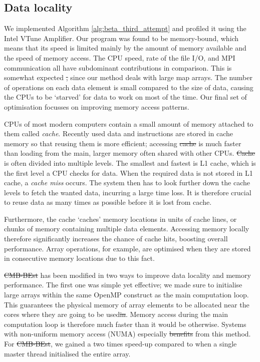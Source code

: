 \documentclass[a4paper,12pt,times,custombib,print,index]{Classes/PhDThesisPSnPDF} %
\providecommand{\DIFadd}[1]{{\protect\color{blue}\uwave{#1}}} %
\providecommand{\DIFdel}[1]{{\protect\color{red}\sout{#1}}}                      %
\providecommand{\DIFaddbegin}{} %
\providecommand{\DIFaddend}{} %
\providecommand{\DIFdelbegin}{} %
\providecommand{\DIFdelend}{} %
\newcommand{\DIFscaledelfig}{0.5}
\newlength{\DIFdelgraphicswidth} %
\newlength{\DIFdelgraphicsheight} %
\newcommand{\DIFaddincludegraphics}[2][]{{\color{blue}\fbox{\DIFOincludegraphics[#1]{#2}}}} %
\newcommand{\DIFdelincludegraphics}[2][]{%
\sbox{\DIFdelgraphicsbox}{\DIFOincludegraphics[#1]{#2}}%
\settoboxwidth{\DIFdelgraphicswidth}{\DIFdelgraphicsbox} %
\settoboxtotalheight{\DIFdelgraphicsheight}{\DIFdelgraphicsbox} %
\scalebox{\DIFscaledelfig}{%
\parbox[b]{\DIFdelgraphicswidth}{\usebox{\DIFdelgraphicsbox}\\[-\baselineskip] \rule{\DIFdelgraphicswidth}{0em}}\llap{\resizebox{\DIFdelgraphicswidth}{\DIFdelgraphicsheight}{%
\setlength{\unitlength}{\DIFdelgraphicswidth}%
\begin{picture}(1,1)%
\thicklines\linethickness{2pt} %
{\color[rgb]{1,0,0}\put(0,0){\framebox(1,1){}}}%
{\color[rgb]{1,0,0}\put(0,0){\line( 1,1){1}}}%
{\color[rgb]{1,0,0}\put(0,1){\line(1,-1){1}}}%
\end{picture}%
}\hspace*{3pt}}} %
} %
\DeclareRobustCommand{\DIFaddbegin}{\DIFOaddbegin \let\includegraphics\DIFaddincludegraphics} %
\DeclareRobustCommand{\DIFaddend}{\DIFOaddend \let\includegraphics\DIFOincludegraphics} %
\DeclareRobustCommand{\DIFdelbegin}{\DIFOdelbegin \let\includegraphics\DIFdelincludegraphics} %
\DeclareRobustCommand{\DIFdelend}{\DIFOaddend \let\includegraphics\DIFOincludegraphics} %
\begin{document}
\subsection{Data locality}

We implemented Algorithm \ref{alg:beta_third_attempt} and profiled it using the Intel VTune Amplifier. Our program was found to be memory-bound, which means that its speed is limited mainly by the amount of memory available and the speed of memory access. The CPU speed, rate of the file I/O, and MPI communication all have subdominant contributions in comparison. This is somewhat expected \DIFdelbegin \DIFdel{, }\DIFdelend since our method deals with large map arrays. The number of operations on each data element is small compared to the size of data, causing the CPUs to be `starved' for data to work on most of the time. Our final set of optimisation focusses on improving memory access patterns.

CPUs of most modern computers contain a small amount of memory attached to them called \textit{cache}. Recently used data and instructions are stored in cache memory so that reusing them is more efficient; accessing \DIFdelbegin \DIFdel{cache }\DIFdelend \DIFaddbegin \DIFadd{them }\DIFaddend is much faster than loading from the main, larger memory often shared with other CPUs. \DIFdelbegin \DIFdel{Cache }\DIFdelend \DIFaddbegin \DIFadd{A cache }\DIFaddend is often divided into multiple levels. The smallest and fastest is \DIFaddbegin \DIFadd{the }\DIFaddend L1 cache, which is the first level a CPU checks for data. When the required data is not stored in \DIFaddbegin \DIFadd{the }\DIFaddend L1 cache, a \textit{cache miss} occurs. The system then has to look further down the cache levels to fetch the wanted data, incurring a large time loss. It is therefore crucial to reuse data as many times as possible before it is lost from \DIFaddbegin \DIFadd{the }\DIFaddend cache.

Furthermore, the cache `caches' memory locations in units of cache lines, or chunks of memory containing multiple data elements. Accessing memory locally therefore significantly increases the chance of cache hits, boosting overall performance. Array operations, for example, are optimised when they are stored in consecutive memory locations due to this fact.

\DIFdelbegin \DIFdel{CMB-BEst }\DIFdelend \DIFaddbegin \textsc{\DIFadd{CMB-BEst}} \DIFaddend has been modified in two ways to improve data locality and memory performance. The first one was simple yet effective; we made sure to initialise large arrays within the same OpenMP construct as the main computation loop. This guarantees the physical memory of array elements to be allocated near the cores where they are going to be used\DIFdelbegin \DIFdel{in}\DIFdelend . Memory access during the main computation loop is therefore much faster than it would be otherwise. Systems with non-uniform memory access (NUMA) especially \DIFdelbegin \DIFdel{benefits }\DIFdelend \DIFaddbegin \DIFadd{benefit }\DIFaddend from this method. For \DIFdelbegin \DIFdel{CMB-BEst}\DIFdelend \DIFaddbegin \textsc{\DIFadd{CMB-BEst}}\DIFaddend , we gained a two times speed-up compared to when a single master thread initialised the entire array.
\end{document}
